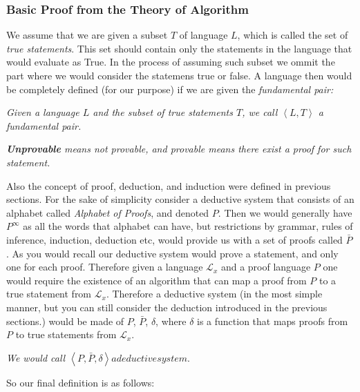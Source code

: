 \documentclass[10pt,a4paper]{article}
\newcommand{\curveL}{\mathcal{L}}
\begin{document}
                    \subsubsection{Basic Proof from the Theory of Algorithm}
                        We assume that we are given a subset $T$ of language $L$, which is called the set of \textit{true statements}. This set should contain only the statements in the language that would evaluate as True. In the process of assuming such subset we ommit the part where we would consider the statemens true or false. A language then would be completely defined (for our purpose) if we are given the \textit{fundamental pair:}
                        \begin{define}
                            \textit{Given a language $L$ and the subset of true statements $T$, we call $\left<L,T\right>$ a fundamental pair.}
                        \end{define}
                        \begin{define}
                            \textit{\textbf{Unprovable} means not provable, and provable means there exist a proof for such statement.}
                        \end{define}
                        Also the concept of proof, deduction, and induction were defined in previous sections. For the sake of simplicity consider a deductive system that consists of an alphabet called \textit{Alphabet of Proofs}, and denoted $P$. Then we would generally have $P^\infty$ as all the words that alphabet can have, but restrictions by grammar, rules of inference, induction, deduction etc, would provide us with a set of proofs called $\bar P$. As you would recall our deductive system would prove a statement, and only one for each proof. Therefore given a language $\curveL_x$ and a proof language $P$ one would require the existence of an algorithm that can map a proof from $P$ to a true statement from $\curveL_x$. Therefore a deductive system (in the most simple manner, but you can still consider the deduction introduced in the previous sections.) would be made of $P$, $\bar P$, $\delta$, where $\delta$ is a function that maps proofs from $P$ to true statements from $\curveL_x$.
                        \begin{define}
                            \textit{We would call $\left<P,\bar P, \delta\right> a deductive system.$}
                        \end{define}
                        So our final definition is as follows:
\end{document}
